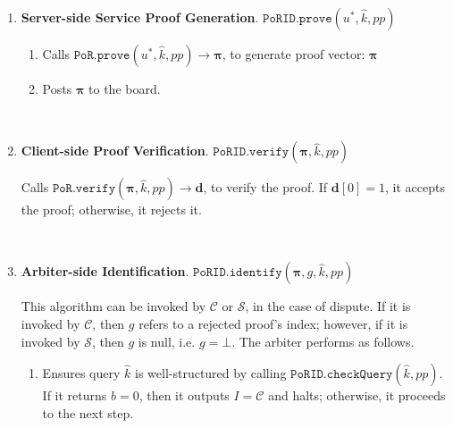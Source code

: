 \begin{enumerate}
\

\item\textbf{Server-side Service Proof Generation}. $\mathtt{PoRID.prove}(u^{\scriptscriptstyle *},\hat{k},pp)$ 
\begin{enumerate}
\item Calls $\mathtt{PoR.prove}(u^{\scriptscriptstyle *},\hat{k},pp)\rightarrow  {\bm{\pi}}$, to generate proof vector: $ {\bm{\pi}}$ 
\item Posts $ {\bm{\pi}}$ to the board. 
\end{enumerate}

\

\item\textbf{Client-side Proof Verification}\label{PoRID::Client-side-Proof-Verification}. $\mathtt{PoRID.verify}( {\bm{\pi}},\hat{k} ,pp)$

 Calls $\mathtt{PoR.verify}( {\bm{\pi}},\hat{k} ,pp)\rightarrow  {\bm{d}}$, to verify the proof. If $ {\bm{d}}[0] = 1$,  it accepts the proof; otherwise, it rejects it.

\

\item\textbf{Arbiter-side Identification}\label{PoRID::Arbiter-side-Identification}. $\mathtt{PoRID.identify}( {\bm{\pi}}, g,\hat{k},pp)$ 

This algorithm can be invoked by $\mathcal{C}$ or $\mathcal{S}$, in the case of dispute. If it is invoked by $\mathcal{C}$, then $g$ refers to a rejected proof's  index; however, if it is invoked by $\mathcal{S}$, then $g$ is null, i.e.  $g=\bot$. The arbiter performs as follows. 


\begin{enumerate}


\item Ensures  query $\hat{k}$ is well-structured by calling $\mathtt{PoRID.checkQuery}(\hat{k}, pp)$. If it returns $b=0$, then it outputs $I=\mathcal C$ and halts; otherwise, it proceeds to the next step. 




\end{enumerate}
\end{enumerate}
